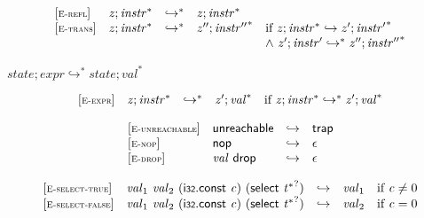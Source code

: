 $$
\begin{array}{@{}l@{}lcl@{}l@{}}
{[\textsc{\scriptsize E{-}refl}]} \quad & {\mathit{z}} ; {{\mathit{instr}}^\ast} &\hookrightarrow^\ast& {\mathit{z}} ; {{\mathit{instr}}^\ast} &  \\
{[\textsc{\scriptsize E{-}trans}]} \quad & {\mathit{z}} ; {{\mathit{instr}}^\ast} &\hookrightarrow^\ast& {\mathit{z}''} ; {{{\mathit{instr}}''}^\ast} &\quad
  \mbox{if}~{\mathit{z}} ; {{\mathit{instr}}^\ast} \hookrightarrow {\mathit{z}'} ; {{{\mathit{instr}}'}^\ast} \\
 &&&&\quad {\land}~{\mathit{z}'} ; {{\mathit{instr}}'} \hookrightarrow^\ast {\mathit{z}''} ; {{{\mathit{instr}}''}^\ast} \\
\end{array}
$$

\vspace{1ex}

$\boxed{{\mathit{state}} ; {\mathit{expr}} \hookrightarrow^\ast {\mathit{state}} ; {{\mathit{val}}^\ast}}$

$$
\begin{array}{@{}l@{}lcl@{}l@{}}
{[\textsc{\scriptsize E{-}expr}]} \quad & {\mathit{z}} ; {{\mathit{instr}}^\ast} &\hookrightarrow^\ast& {\mathit{z}'} ; {{\mathit{val}}^\ast} &\quad
  \mbox{if}~{\mathit{z}} ; {{\mathit{instr}}^\ast} \hookrightarrow^\ast {\mathit{z}'} ; {{\mathit{val}}^\ast} \\
\end{array}
$$

\vspace{1ex}

\vspace{1ex}

$$
\begin{array}{@{}l@{}lcl@{}l@{}}
{[\textsc{\scriptsize E{-}unreachable}]} \quad & \mathsf{unreachable} &\hookrightarrow& \mathsf{trap} &  \\
{[\textsc{\scriptsize E{-}nop}]} \quad & \mathsf{nop} &\hookrightarrow& \epsilon &  \\
{[\textsc{\scriptsize E{-}drop}]} \quad & {\mathit{val}}~\mathsf{drop} &\hookrightarrow& \epsilon &  \\
\end{array}
$$

\vspace{1ex}

$$
\begin{array}{@{}l@{}lcl@{}l@{}}
{[\textsc{\scriptsize E{-}select{-}true}]} \quad & {\mathit{val}}_{{1}}~{\mathit{val}}_{{2}}~(\mathsf{i{\scriptstyle32}}.\mathsf{const}~{\mathit{c}})~(\mathsf{select}~{{{\mathit{t}}^\ast}^?}) &\hookrightarrow& {\mathit{val}}_{{1}} &\quad
  \mbox{if}~{\mathit{c}} \neq 0 \\
{[\textsc{\scriptsize E{-}select{-}false}]} \quad & {\mathit{val}}_{{1}}~{\mathit{val}}_{{2}}~(\mathsf{i{\scriptstyle32}}.\mathsf{const}~{\mathit{c}})~(\mathsf{select}~{{{\mathit{t}}^\ast}^?}) &\hookrightarrow& {\mathit{val}}_{{2}} &\quad
  \mbox{if}~{\mathit{c}} = 0 \\
\end{array}
$$

